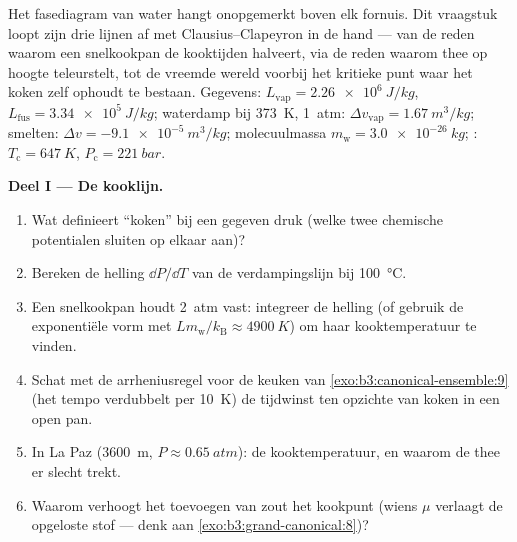 \begin{problem}\label{pb:b3:phase-transitions:1}
Het fasediagram van water hangt onopgemerkt boven elk fornuis. Dit
vraagstuk loopt zijn drie lijnen af met Clausius--Clapeyron in de hand ---
van de reden waarom een snelkookpan de kooktijden halveert, via de reden
waarom thee op hoogte teleurstelt, tot de vreemde wereld voorbij het
kritieke punt waar het koken zelf ophoudt te bestaan. Gegevens: $L_{\text{vap}}
= \qty{2.26e6}{J/kg}$, $L_{\text{fus}} = \qty{3.34e5}{J/kg}$;
waterdamp bij \qty{373}{K}, \qty{1}{atm}: $\Delta v_{\text{vap}}
= \qty{1.67}{m^3/kg}$; smelten: $\Delta v = \qty{-9.1e-5}{m^3/kg}$;
molecuulmassa $m_{\text{w}} = \qty{3.0e-26}{kg}$; :
$T_{\text{c}} = \qty{647}{K}$, $P_{\text{c}} = \qty{221}{bar}$.

\medskip\noindent\textbf{Deel I --- De kooklijn.}
\begin{enumerate}
  \item Wat definieert ``koken'' bij een gegeven druk (welke twee
        chemische potentialen sluiten op elkaar aan)?
  \item Bereken de helling $\dd P/\dd T$ van de verdampingslijn
        bij \qty{100}{\celsius}.
  \item Een snelkookpan houdt \qty{2}{atm} vast: integreer de helling
        (of gebruik de exponentiële vorm met $Lm_{\text{w}}/
        k_{\text{B}} \approx \qty{4900}{K}$) om haar
        kooktemperatuur te vinden.
  \item Schat met de arrheniusregel voor de keuken van
        \cref{exo:b3:canonical-ensemble:9} (het tempo verdubbelt per
        \qty{10}{K}) de tijdwinst ten opzichte van koken in een
        open pan.
  \item In La Paz (\qty{3600}{m}, $P \approx \qty{0.65}{atm}$):
        de kooktemperatuur, en waarom de thee er slecht trekt.
  \item Waarom verhoogt het toevoegen van zout het kookpunt (wiens $\mu$
        verlaagt de opgeloste stof --- denk aan
        \cref{exo:b3:grand-canonical:8})?
\end{enumerate}


\end{problem}
